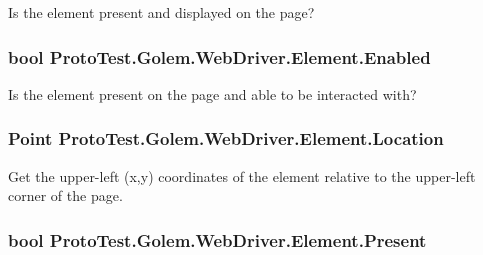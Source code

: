 Is the element present and displayed on the page? 

\hypertarget{class_proto_test_1_1_golem_1_1_web_driver_1_1_element_ab60ba928770c80ed9d58858b58522785}{
\subsubsection[{Enabled}]{\setlength{\rightskip}{0pt plus 5cm}bool Proto\-Test.\-Golem.\-Web\-Driver.\-Element.\-Enabled\hspace{0.3cm}{\ttfamily [get]}}}\label{class_proto_test_1_1_golem_1_1_web_driver_1_1_element_ab60ba928770c80ed9d58858b58522785}


Is the element present on the page and able to be interacted with? 

\hypertarget{class_proto_test_1_1_golem_1_1_web_driver_1_1_element_a9ac12ce269e1e373fe01f9bc4a1c594a}{
\subsubsection[{Location}]{\setlength{\rightskip}{0pt plus 5cm}Point Proto\-Test.\-Golem.\-Web\-Driver.\-Element.\-Location\hspace{0.3cm}{\ttfamily [get]}}}\label{class_proto_test_1_1_golem_1_1_web_driver_1_1_element_a9ac12ce269e1e373fe01f9bc4a1c594a}


Get the upper-\/left (x,y) coordinates of the element relative to the upper-\/left corner of the page. 

\hypertarget{class_proto_test_1_1_golem_1_1_web_driver_1_1_element_adedd809d0baf2f903a8e51fd4f4a4d26}{
\subsubsection[{Present}]{\setlength{\rightskip}{0pt plus 5cm}bool Proto\-Test.\-Golem.\-Web\-Driver.\-Element.\-Present\hspace{0.3cm}{\ttfamily [get]}}}\label{class_proto_test_1_1_golem_1_1_web_driver_1_1_element_adedd809d0baf2f903a8e51fd4f4a4d26}


